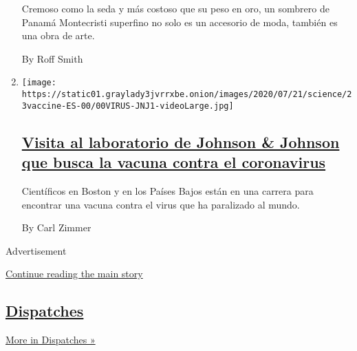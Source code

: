 \begin{enumerate}
  Cremoso como la seda y más costoso que su peso en oro, un sombrero de
  Panamá Montecristi superfino no solo es un accesorio de moda, también
  es una obra de arte.

  By Roff Smith
\item
  \texttt{[image: https://static01.graylady3jvrrxbe.onion/images/2020/07/21/science/23vaccine-ES-00/00VIRUS-JNJ1-videoLarge.jpg]}

  \hypertarget{visita-al-laboratorio-de-johnson--johnson-que-busca-la-vacuna-contra-el-coronavirus}{%
  \subsection{\texorpdfstring{\href{/es/2020/07/23/espanol/ciencia-y-tecnologia/vacuna-coronavirus.html}{Visita
  al laboratorio de Johnson \& Johnson que busca la vacuna contra el
  coronavirus}}{Visita al laboratorio de Johnson \& Johnson que busca la vacuna contra el coronavirus}}\label{visita-al-laboratorio-de-johnson--johnson-que-busca-la-vacuna-contra-el-coronavirus}}

  Científicos en Boston y en los Países Bajos están en una carrera para
  encontrar una vacuna contra el virus que ha paralizado al mundo.

  By Carl Zimmer
\end{enumerate}

Advertisement

\protect\hyperlink{after-mid2}{Continue reading the main story}

\hypertarget{dispatches}{%
\subsection{\texorpdfstring{\href{/spotlight/dispatches-international}{Dispatches}}{Dispatches}}\label{dispatches}}

\href{/spotlight/dispatches-international}{More in Dispatches »}

